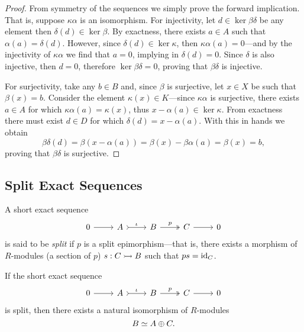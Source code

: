 \begin{proof}
    From symmetry of the sequences we simply prove the forward implication. That is,
    suppose \(\kappa \alpha\) is an isomorphism. For injectivity, let
    \(d \in \ker \beta \delta\) be any element then \(\delta(d) \in \ker \beta\). By
    exactness, there exists \(a \in A\) such that \(\alpha(a) =
    \delta(d)\). However, since \(\delta(d) \in \ker \kappa\), then
    \(\kappa \alpha(a) = 0\)---and by the injectivity of \(\kappa \alpha\) we find
    that \(a = 0\), implying in \(\delta(d) = 0\). Since \(\delta\) is also
    injective, then \(d = 0\), therefore \(\ker \beta \delta = 0\), proving that
    \(\beta \delta\) is injective.

    For surjectivity, take any \(b \in B\) and, since \(\beta\) is surjective, let
    \(x \in X\) be such that \(\beta(x) = b\). Consider the element
    \(\kappa(x) \in K\)---since \(\kappa \alpha\) is surjective, there exists
    \(a \in A\) for which \(\kappa \alpha(a) = \kappa(x)\), thus
    \(x - \alpha(a) \in \ker \kappa\). From exactness there must exist \(d \in D\)
    for which \(\delta(d) = x - \alpha(a)\). With this in hands we obtain
    \[
        \beta \delta(d)
        = \beta(x - \alpha(a))
        = \beta(x) - \beta \alpha(a)
        = \beta(x)
        = b,
    \]
    proving that \(\beta \delta\) is surjective.
\end{proof}

\subsection{Split Exact Sequences}

\begin{definition}
    \label{def:split-short-exact-sequence}
    A short exact sequence
    \[
        \begin{tikzcd}
            0 \ar[r] &A \ar[r, tail, "\iota"] &B \ar[r, two heads, "p"] &C \ar[r] &0
        \end{tikzcd}
    \]
    is said to be \emph{split} if \(p\) is a split epimorphism---that is, there
    exists a morphism of \(R\)-modules (a section of \(p\)) \(s: C \rightarrowtail B\) such
    that \(p s = \operatorname{id}_C\).
\end{definition}

\begin{proposition}
    \label{prop:splitting-of-sequence}
    If the short exact sequence
    \[
        \begin{tikzcd}
            0 \ar[r] &A \ar[r, tail, "\iota"] &B \ar[r, two heads, "p"] &C \ar[r] &0
        \end{tikzcd}
    \]
    is split, then there exists a natural isomorphism of \(R\)-modules
    \[
        B \simeq A \oplus C.
    \]
\end{proposition}

